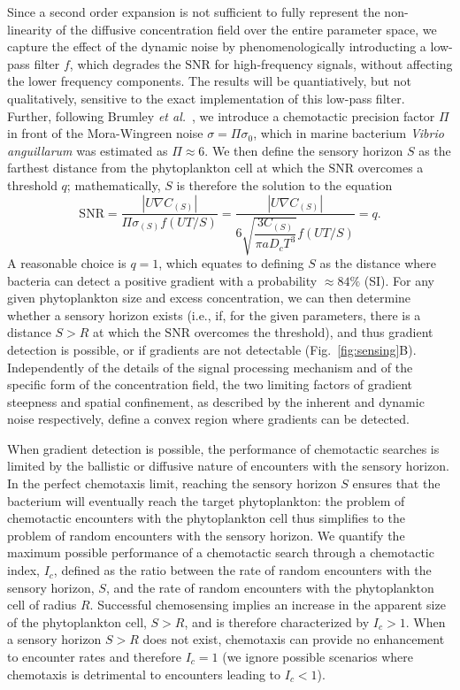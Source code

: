 \documentclass[9pt,twocolumn,twoside]{pnas-new}
\newcommand{\SNR}{\mathrm{SNR}}
\begin{document}
Since a second order expansion is not sufficient to fully represent the non-linearity of the diffusive concentration field over the entire parameter space, we capture the effect of the dynamic noise by phenomenologically introducting a low-pass filter $f$, which degrades the $\SNR$ for high-frequency signals, without affecting the lower frequency components. The results will be quantiatively, but not qualitatively, sensitive to the exact implementation of this low-pass filter.
Further, following Brumley \textit{et al.}~\cite{brumley2019bacteria}, we introduce a chemotactic precision factor $\Pi$ in front of the Mora-Wingreen noise $\sigma = \Pi\sigma_0$, which in marine bacterium \textit{Vibrio anguillarum} was estimated as $\Pi\approx6$.
We then define the sensory horizon $S$ as the farthest distance from the phytoplankton cell at which the $\SNR$ overcomes a threshold $q$; mathematically, $S$ is therefore the solution to the equation
\begin{equation}
  \SNR = \dfrac{|U\nabla C_{(S)}|}{\Pi\sigma_{(S)}f(UT/S)} =
    \dfrac{|U\nabla C_{(S)}|}{6\sqrt{\dfrac{3C_{(S)}}{\pi a D_c T^3}}f(UT/S)} = q.
\end{equation}
A reasonable choice is $q=1$, which equates to defining $S$ as the distance where bacteria can detect a positive gradient with a probability $\approx 84\%$ (SI).
For any given phytoplankton size and excess concentration, we can then determine whether a sensory horizon exists (i.e., if, for the given parameters, there is a distance $S>R$ at which the $\SNR$ overcomes the threshold), and thus gradient detection is possible, or if gradients are not detectable (Fig.~\ref{fig:sensing}B).
Independently of the details of the signal processing mechanism and of the specific form of the concentration field, the two limiting factors of gradient steepness and spatial confinement, as described by the inherent and dynamic noise respectively, define a convex region where gradients can be detected.

When gradient detection is possible, the performance of chemotactic searches is limited by the ballistic or diffusive nature of encounters with the sensory horizon.
In the perfect chemotaxis limit, reaching the sensory horizon $S$ ensures that the bacterium will eventually reach the target phytoplankton: the problem of chemotactic encounters with the phytoplankton cell thus simplifies to the problem of random encounters with the sensory horizon.
We quantify the maximum possible performance of a chemotactic search through a chemotactic index, $I_c$, defined as the ratio between the rate of random encounters with the sensory horizon, $S$, and the rate of random encounters with the phytoplankton cell of radius $R$.
Successful chemosensing implies an increase in the apparent size of the phytoplankton cell, $S>R$, and is therefore characterized by $I_c>1$.
When a sensory horizon $S>R$ does not exist, chemotaxis can provide no enhancement to encounter rates and therefore $I_c=1$ (we ignore possible scenarios where chemotaxis is detrimental to encounters leading to $I_c<1$).
\end{document}
